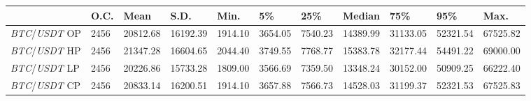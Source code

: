 \begin{tabular}{lllllllllll}
\toprule
 & \textbf{O.C.} & \textbf{Mean} & \textbf{S.D.} & \textbf{Min.} & \textbf{5\%} & \textbf{25\%} & \textbf{Median} & \textbf{75\%} & \textbf{95\%} & \textbf{Max.} \\
\midrule
\emph{BTC}/\emph{USDT} OP & 2456 & 20812.68 & 16192.39 & 1914.10 & 3654.05 & 7540.23 & 14389.99 & 31133.05 & 52321.54 & 67525.82 \\
\emph{BTC}/\emph{USDT} HP & 2456 & 21347.28 & 16604.65 & 2044.40 & 3749.55 & 7768.77 & 15383.78 & 32177.44 & 54491.22 & 69000.00 \\
\emph{BTC}/\emph{USDT} LP & 2456 & 20226.86 & 15733.28 & 1809.00 & 3566.69 & 7359.50 & 13348.24 & 30152.00 & 50909.25 & 66222.40 \\
\emph{BTC}/\emph{USDT} CP & 2456 & 20833.14 & 16200.51 & 1914.10 & 3657.88 & 7566.73 & 14528.03 & 31199.37 & 52321.53 & 67525.83 \\
\bottomrule
\end{tabular}
